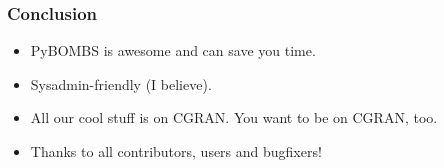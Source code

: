 \documentclass{beamer}
\begin{document}
\begin{frame}
  \frametitle{Conclusion}
  \begin{itemize}
    \item PyBOMBS is awesome and can save you time.
    \item Sysadmin-friendly (I believe).
    \item All our cool stuff is on CGRAN\@. You want to be on CGRAN, too.
    \item Thanks to all contributors, users and bugfixers!
  \end{itemize}
\end{frame}
\end{document}
